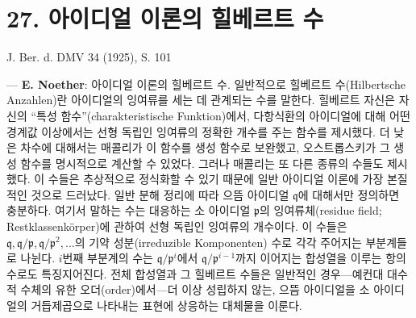 
\section*{27. 아이디얼 이론의 힐베르트 수}

\begin{center}
J. Ber. d. DMV 34 (1925), S. 101
\end{center}

--- \textbf{E. Noether}: 아이디얼 이론의 힐베르트 수. 일반적으로 힐베르트 수(Hilbertsche Anzahlen)란 아이디얼의 잉여류를 세는 데 관계되는 수를 말한다. 힐베르트 자신은 자신의 ``특성 함수''(charakteristische Funktion)에서, 다항식환의 아이디얼에 대해 어떤 경계값 이상에서는 선형 독립인 잉여류의 정확한 개수를 주는 함수를 제시했다. 더 낮은 차수에 대해서는 매콜리가 이 함수를 생성 함수로 보완했고, 오스트롭스키가 그 생성 함수를 명시적으로 계산할 수 있었다. 그러나 매콜리는 또 다른 종류의 수들도 제시했다. 이 수들은 추상적으로 정식화할 수 있기 때문에 일반 아이디얼 이론에 가장 본질적인 것으로 드러났다. 일반 분해 정리에 따라 으뜸 아이디얼 $\mathfrak q$에 대해서만 정의하면 충분하다. 여기서 말하는 수는 대응하는 소 아이디얼 $\mathfrak p$의 잉여류체(residue field; Restklassenkörper)에 관하여 선형 독립인 잉여류의 개수이다. 이 수들은 $\mathfrak q,\mathfrak q/\mathfrak p,\mathfrak q/\mathfrak p^2,\ldots$의 기약 성분(irreduzible Komponenten) 수로 각각 주어지는 부분계들로 나뉜다. $i$번째 부분계의 수는 $\mathfrak q/\mathfrak p^i$에서 $\mathfrak q/\mathfrak p^{i-1}$까지 이어지는 합성열을 이루는 항의 수로도 특징지어진다. 전체 합성열과 그 힐베르트 수들은 일반적인 경우---예컨대 대수적 수체의 유한 오더(order)에서---더 이상 성립하지 않는, 으뜸 아이디얼을 소 아이디얼의 거듭제곱으로 나타내는 표현에 상응하는 대체물을 이룬다.
